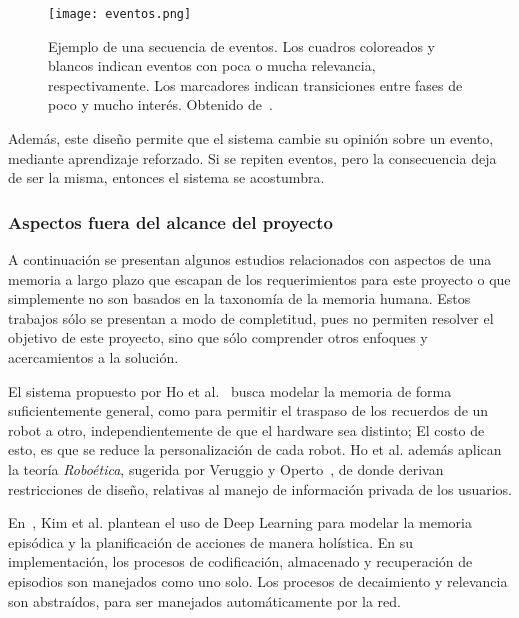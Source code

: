 \begin{figure}[!h]
	\centering
	\texttt{[image: eventos.png]}
	\caption{\small Ejemplo de una secuencia de eventos. Los cuadros coloreados y blancos indican eventos con poca o mucha relevancia, respectivamente. Los marcadores indican transiciones entre fases de poco y mucho interés. Obtenido de~\cite{Kelley2014}.}
	\label{img:sleep_eventos}
\end{figure}


Además, este diseño permite que el sistema cambie su opinión sobre un evento, mediante aprendizaje reforzado. Si se repiten eventos, pero la consecuencia deja de ser la misma, entonces el sistema se acostumbra.


\subsubsection{Aspectos fuera del alcance del proyecto}\label{sec:otros_aspectos}

A continuación se presentan algunos estudios relacionados con aspectos de una memoria a largo plazo que escapan de los requerimientos para este proyecto o que simplemente no son basados en la taxonomía de la memoria humana. Estos trabajos sólo se presentan a modo de completitud, pues no permiten resolver el objetivo de este proyecto, sino que sólo comprender otros enfoques y acercamientos a la solución. 

El sistema propuesto por Ho et al.~\cite{Ho2009} busca modelar la memoria de forma suficientemente general, como para permitir el traspaso de los recuerdos de un robot a otro, independientemente de que el hardware sea distinto; El costo de esto, es que se reduce la personalización de cada robot. Ho et al. además aplican la teoría \textit{Roboética}, sugerida por Veruggio y Operto~\cite{Veruggio2006}, de donde derivan restricciones de diseño, relativas al manejo de información privada de los usuarios.

En~\cite{KimMinJoo2016}, Kim et al. plantean el uso de Deep Learning para modelar la memoria episódica y la planificación de acciones de manera holística. En su implementación, los procesos de codificación, almacenado y recuperación de episodios son manejados como uno solo. Los procesos de decaimiento y relevancia son abstraídos, para ser manejados automáticamente por la red.

